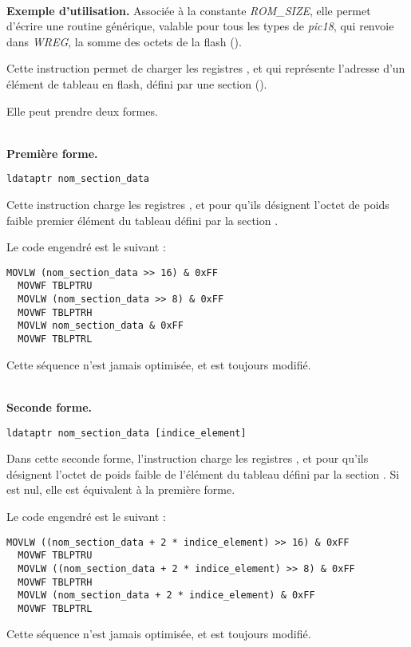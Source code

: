 ~\\
\textbf{Exemple d'utilisation.} Associée à la constante \emph{ROM\_SIZE}, elle permet d'écrire une routine générique, valable pour tous les types de \emph{pic18}, qui renvoie dans \emph{WREG}, la somme des octets de la flash ().



Cette instruction permet de charger les registres ,  et  qui représente l'adresse d'un élément de tableau en flash, défini par une section  ().

Elle peut prendre deux formes.

~\\
\textbf{Première forme.}

\begin{lstlisting}[language=piccolo]
  ldataptr nom_section_data
\end{lstlisting}

Cette instruction charge les registres ,  et  pour qu'ils désignent l'octet de poids faible premier élément du tableau défini par la section .

Le code engendré est le suivant :
\begin{lstlisting}[language=assembleur]
  MOVLW (nom_section_data >> 16) & 0xFF
  MOVWF TBLPTRU
  MOVLW (nom_section_data >> 8) & 0xFF
  MOVWF TBLPTRH
  MOVLW nom_section_data & 0xFF
  MOVWF TBLPTRL
\end{lstlisting}

Cette séquence n'est jamais optimisée, et  est toujours modifié.

~\\
\textbf{Seconde forme.}

\begin{lstlisting}[language=piccolo]
  ldataptr nom_section_data [indice_element]
\end{lstlisting}

Dans cette seconde forme, l'instruction charge les registres ,  et  pour qu'ils désignent l'octet de poids faible de l'élément  du tableau défini par la section . Si  est nul, elle est équivalent à la première forme.

Le code engendré est le suivant :
\begin{lstlisting}[language=assembleur]
  MOVLW ((nom_section_data + 2 * indice_element) >> 16) & 0xFF
  MOVWF TBLPTRU
  MOVLW ((nom_section_data + 2 * indice_element) >> 8) & 0xFF
  MOVWF TBLPTRH
  MOVLW (nom_section_data + 2 * indice_element) & 0xFF
  MOVWF TBLPTRL
\end{lstlisting}

Cette séquence n'est jamais optimisée, et  est toujours modifié.




